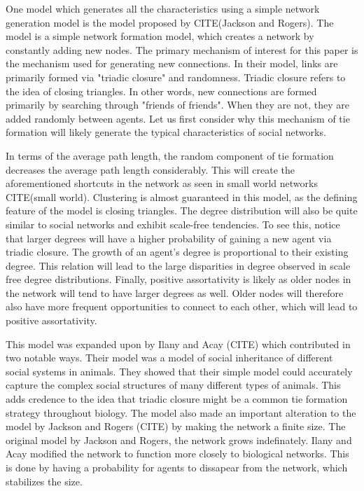 \documentclass[9pt,twocolumn,twoside]{ilcss}
\begin{document}
One model which generates all the characteristics using a simple network generation model is the model proposed by CITE(Jackson and Rogers). 
The model is a simple network formation model, which creates a network by constantly adding new nodes. The primary mechanism of interest for this paper is the mechanism used for generating new connections.
In their model, links are primarily formed via "triadic closure" and randomness. Triadic closure refers to the idea of closing triangles. In other words, new connections are formed primarily by searching through "friends of friends". When they are not, they are added randomly between agents.
Let us first consider why this mechanism of tie formation will likely generate the typical characteristics of social networks. 

In terms of the average path length, the random component of tie formation decreases the average path length considerably. This will create the aforementioned shortcuts in the network as seen in small world networks CITE(small world).
Clustering is almost guaranteed in this model, as the defining feature of the model is closing triangles. 
The degree distribution will also be quite similar to social networks and exhibit scale-free tendencies. 
To see this, notice that larger degrees will have a higher probability of gaining a new agent via triadic closure. The growth of an agent's degree is proportional to their existing degree. This relation will lead to the large disparities in degree observed in scale free degree distributions.
Finally, positive assortativity is likely as older nodes in the network will tend to have larger degrees as well. Older nodes will therefore also have more frequent opportunities to connect to each other, which will lead to positive assortativity. 

This model was expanded upon by Ilany and Acay (CITE) which contributed in two notable ways. 
Their model was a model of social inheritance of different social systems in animals. 
They showed that their simple model could accurately capture the complex social structures of many different types of animals.
This adds credence to the idea that triadic closure might be a common tie formation strategy throughout biology. 
The model also made an important alteration to the model by Jackson and Rogers (CITE) by making the network a finite size.
The original model by Jackson and Rogers, the network grows indefinately. Ilany and Acay modified the network to function more closely to biological networks.
This is done by having a probability for agents to dissapear from the network, which stabilizes the size. 
\end{document}
